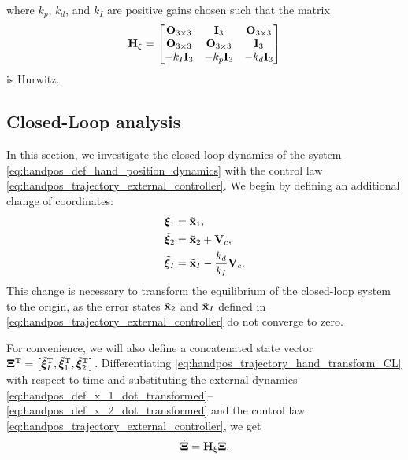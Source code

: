 \noindent where $k_p$, $k_d$, and $k_I$ are positive gains chosen such that the matrix
\begin{equation}
    \mathbf{H}_{\xi}
    =
    \begin{bmatrix}
        \mathbf{O}_{3 \times 3} & \mathbf{I}_{3} & \mathbf{O}_{3 \times 3} \\ \mathbf{O}_{3 \times 3} & \mathbf{O}_{3 \times 3} & \mathbf{I}_{3} \\ -k_I \mathbf{I}_{3} & -k_p \mathbf{I}_{3} & -k_d \mathbf{I}_{3}
    \end{bmatrix} \label{eq:handpos_trajectory_H_xi}
\end{equation}
is Hurwitz.

\subsection{Closed-Loop analysis}
In this section, we investigate the closed-loop dynamics of the system \eqref{eq:handpos_def_hand_position_dynamics} with the control law \eqref{eq:handpos_trajectory_external_controller}.
We begin by defining an additional change of coordinates:
\begin{subequations}
    \begin{align}
        \tilde{\bm{\xi}}_1 &= \tilde{\mathbf{x}}_1, \\
        \tilde{\bm{\xi}}_2 &= \tilde{\mathbf{x}}_2 + \mathbf{V}_c, \\
        \tilde{\bm{\xi}}_I &= \tilde{\mathbf{x}}_I - \frac{k_d}{k_I}\mathbf{V}_c.
    \end{align} \label{eq:handpos_trajectory_hand_transform_CL}
\end{subequations}
This change is necessary to transform the equilibrium of the closed-loop system to the origin, as the error states $\tilde{\mathbf{x}}_2$ and $\tilde{\mathbf{x}}_I$ defined in \eqref{eq:handpos_trajectory_external_controller} do not converge to zero.

For convenience, we will also define a concatenated state vector $\bm{\Xi}^{\mathrm{T}} = \left[{\tilde{\bm{\xi}}}_I^{\mathrm{T}}, {\tilde{\bm{\xi}}}_1^{\mathrm{T}}, {\tilde{\bm{\xi}}}_2^{\mathrm{T}}\right]$.
Differentiating \eqref{eq:handpos_trajectory_hand_transform_CL} with respect to time and substituting the external dynamics \eqref{eq:handpos_def_x_1_dot_transformed}--\eqref{eq:handpos_def_x_2_dot_transformed} and the control law \eqref{eq:handpos_trajectory_external_controller}, we get
\begin{equation}
    \dot{\bm{\Xi}} = \mathbf{H}_{\xi} \bm{\Xi}. \label{eq:handpos_trajectory_external_dynamics}
\end{equation}

